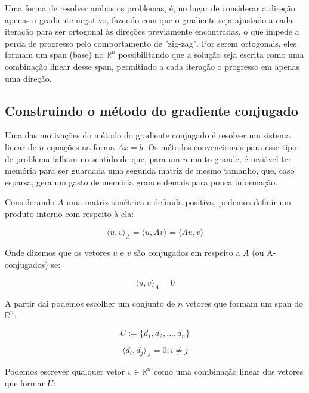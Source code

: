 Uma forma de resolver ambos os problemas, é, no lugar de considerar a direção
apenas o gradiente negativo, fazendo com que o gradiente seja ajustado a cada
iteração para ser ortogonal às direções previamente encontradas, o que impede
a perda de progresso pelo comportamento de "zig-zag". Por serem ortogonais,
eles formam um span (base) no \( \mathbb{R}^n \) possibilitando que a solução
seja escrita como uma combinação linear desse span, permitindo a cada iteração
o progresso em apenas uma direção.

\subsection{Construindo o método do gradiente conjugado}

Uma das motivações do método do gradiente conjugado \cite{bonnans2006numerical}
\cite{1987polyak} é resolver um sistema linear de \(n\) equações na forma \(Ax = b \).
Os métodos convencionais para esse tipo de problema falham no sentido de que, para um
\(n\) muito grande, é inviável ter memória para ser guardada uma segunda matriz de
mesmo tamanho, que, caso esparsa, gera um gasto de memória grande demais para pouca
informação.

Considerando \(A\) uma matriz simétrica e definida positiva, podemos definir um produto
interno com respeito à ela:

\begin{equation}
\langle u, v \rangle_A = \langle u, Av \rangle =  \langle Au, v \rangle 
\end{equation}

Onde dizemos que os vetores \(u\) e \(v\) são conjugados em respeito a \(A\) (ou A-conjugados) se:

\begin{equation}
\langle u, v \rangle_A = 0
\end{equation}

A partir dai podemos escolher um conjunto de \(n\) vetores que formam um span do
\( \mathbb{R}^n \):

\begin{equation}
U := \{d_1, d_2, ..., d_n\}
\end{equation}

\begin{equation}
\label{gc_prod_interno}
\langle d_i, d_j \rangle_A = 0; i \ne j
\end{equation}

Podemos escrever qualquer vetor \(v \in \mathbb{R}^n\) como uma combinação linear dos
vetores que formar \(U\):

